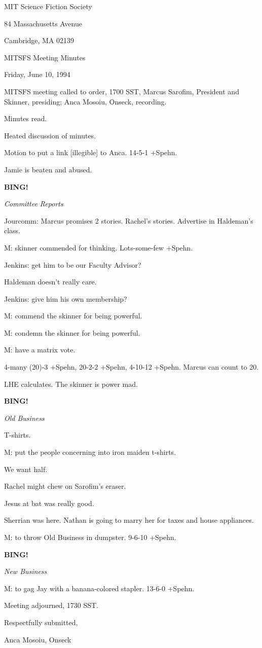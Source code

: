 \documentclass[12pt]{article}
\newcommand{\bing}{{\bf BING!} }
\newcommand{\goto}[1]{\bing \vskip 12pt \centerline{{\em{#1}}}}
\begin{document}
\begin{center}

MIT Science Fiction Society 

84 Massachusetts Avenue

Cambridge, MA 02139

\vspace{12pt}

MITSFS Meeting Minutes 

Friday, June 10, 1994

\end{center}
 
\vspace{18pt}

\setlength{\parskip}{6pt}

\noindent
MITSFS meeting called to order, 1700 SST,
Marcus Sarofim, President and Skinner, presiding; Anca Mosoiu, Onseck, recording.

Minutes read.

Heated discussion of minutes.

Motion to put a link [illegible] to Anca. 14-5-1 +Spehn.

Jamie is beaten and abused.

\goto{Committee Reports}

Jourcomm: Marcus promises 2 stories. Rachel's stories. Advertise in Haldeman's class.

M: skinner commended for thinking. Lots-some-few +Spehn.

Jenkins: get him to be our Faculty Advisor?

Haldeman doesn't really care.

Jenkins: give him his own membership?

M: commend the skinner for being powerful.

M: condemn the skinner for being powerful.

M: have a matrix vote.

4-many (20)-3 +Spehn, 20-2-2 +Spehn, 4-10-12 +Spehn. Marcus can count to 20.

LHE calculates. The skinner is power mad.

\goto{Old Business}

T-shirts.

M: put the people concerning into iron maiden t-shirts.

We want half.

Rachel might chew on Sarofim's eraser.

Jesus at bat was really good.

Sherrian was here. Nathan is going to marry her for taxes and house appliances.

M: to throw Old Business in dumpster. 9-6-10 +Spehn.

\goto{New Business}

M: to gag Jay with a banana-colored stapler. 13-6-0 +Spehn.

\vspace{12pt}

\noindent
Meeting adjourned, 1730 SST.

\vspace{18pt}

\centerline{Respectfully submitted,}
\centerline{Anca Mosoiu, Onseck}
\end{document}
